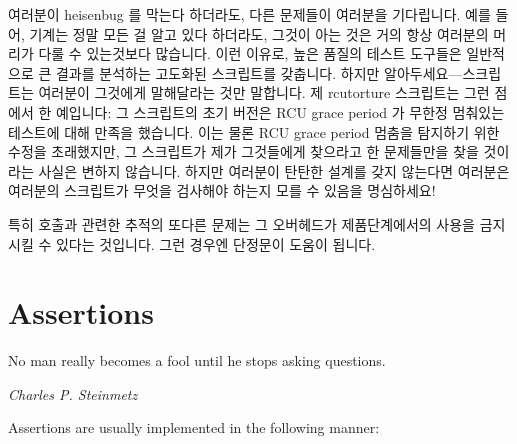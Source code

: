 \fi

여러분이 heisenbug 를 막는다 하더라도, 다른 문제들이 여러분을 기다립니다.
예를 들어, 기계는 정말 모든 걸 알고 있다 하더라도, 그것이 아는 것은 거의 항상
여러분의 머리가 다룰 수 있는것보다 많습니다.
이런 이유로, 높은 품질의 테스트 도구들은 일반적으로 큰 결과를 분석하는 고도화된
스크립트를 갖춥니다.
하지만 알아두세요---스크립트는 여러분이 그것에게 말해달라는 것만 말합니다.
제 rcutorture 스크립트는 그런 점에서 한 예입니다: 그 스크립트의 초기 버전은 RCU
grace period 가 무한정 멈춰있는 테스트에 대해 만족을 했습니다.
이는 물론 RCU grace period 멈춤을 탐지하기 위한 수정을 초래했지만, 그
스크립트가 제가 그것들에게 찾으라고 한 문제들만을 찾을 것이라는 사실은 변하지
않습니다.
하지만 여러분이 탄탄한 설계를 갖지 않는다면 여러분은 여러분의 스크립트가 무엇을
검사해야 하는지 모를 수 있음을 명심하세요!

특히  호출과 관련한 추적의 또다른 문제는 그 오버헤드가
제품단계에서의 사용을 금지시킬 수 있다는 것입니다.
그런 경우엔 단정문이 도움이 됩니다.

\section{Assertions}
\label{sec:debugging:Assertions}
%
\epigraph{No man really becomes a fool until he stops asking questions.}
	 {\emph{Charles P. Steinmetz}}

Assertions are usually implemented in the following manner:

